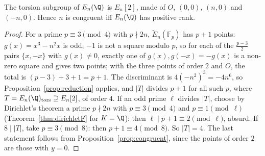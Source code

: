 \begin{proposition}\label{prop:entors}
The torsion subgroup of $E_n(\Q)$ is $E_n[2]$, made of $O$, $(0,0)$, $(n,0)$ and $(-n,0)$. Hence $n$ is congruent iff $E_n(\Q)$ has positive rank.
\end{proposition}
\begin{proof}
For a prime $p\equiv3\pmod4$ with $p\nmid2n$, $\tilde E_n(\mathbb F_p)$ has $p+1$ points: $g(x)=x^3-n^2x$ is odd, $-1$ is not a square modulo $p$, so for each of the
$\frac{p-3}2$ pairs $\{x,-x\}$ with $g(x)\ne0$, exactly one of $g(x),g(-x)=-g(x)$ is a non-zero square and gives two points; with the three points of order $2$ and $O$,
the total is $(p-3)+3+1=p+1$. The discriminant is $4(-n^2)^3=-4n^6$, so Proposition~\ref{prop:reduction} applies, and $|T|$ divides $p+1$ for all such $p$, where
$T=E_n(\Q)_{\mathrm{tors}}\supseteq E_n[2]$, of order $4$. If an odd prime $\ell$ divides $|T|$, choose by Dirichlet's theorem a prime $p\nmid2n$ with $p\equiv3\pmod4$
and $p\equiv1\pmod\ell$ (Theorem~\ref{thm:dirichletF} for $K=\Q$): then $\ell\mid p+1\equiv2\pmod\ell$, absurd. If $8\mid|T|$, take $p\equiv3\pmod8$: then $p+1\equiv4\pmod8$.
So $|T|=4$. The last statement follows from Proposition~\ref{prop:congruent}, since the points of order $2$ are those with $y=0$.
\end{proof}

